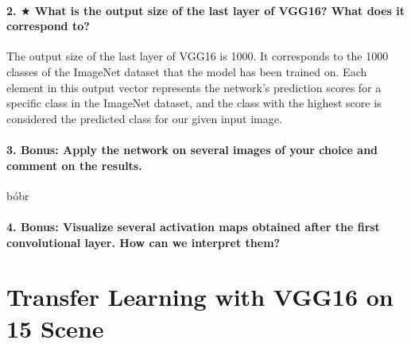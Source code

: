 







\paragraph{2. $\bigstar$ What is the output size of the last layer of VGG16? What does it correspond to?}
The output size of the last layer of VGG16 is 1000. It corresponds to the 1000 classes of the ImageNet dataset that the model has been trained on. Each element in this output vector represents  the network's prediction scores for a specific class in the ImageNet dataset, and the class with the highest score is considered the predicted class for our given input image.

\paragraph{3. \textbf{Bonus}: Apply the network on several images of your choice and comment on the results.}
bóbr

\paragraph{4. \textbf{Bonus}: Visualize several activation maps obtained after the first convolutional layer. How can we interpret them?}

\section{Transfer Learning with VGG16 on 15 Scene}
